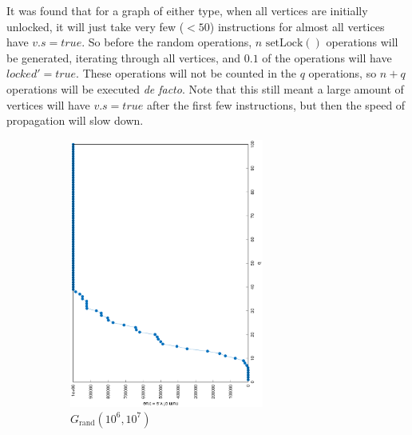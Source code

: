 \documentclass[12pt]{report}
\begin{document}
It was found that for a graph of either type, when all vertices are initially unlocked,
it will just take very few ($ < 50 $) instructions for almost all vertices have $ v.s = \mathit{true} $.
So before the random operations, $ n $ $ \mathrm{setLock}() $ operations will be generated,
iterating through all vertices, and $ 0.1 $ of the operations will have $ \mathit{locked}' = \mathit{true} $.
These operations will not be counted in the $ q $ operations,
so $ n + q $ operations will be executed \textit{de facto}.
Note that this still meant a large amount of vertices will have $ v.s = \mathit{true} $ after the first few instructions,
but then the speed of propagation will slow down.

\begin{figure}
\centering
\begin{subfigure}{0.45\textwidth}
	\includegraphics[width=0.7\textwidth,angle=-90]{graph/uniform_coverage_1000000_10000000_0.eps}
	\caption{$ G_\mathrm{rand}(10^6, 10^7) $}
\end{subfigure}
\begin{subfigure}{0.45\textwidth}

\end{subfigure}
\end{figure}
\end{document}
